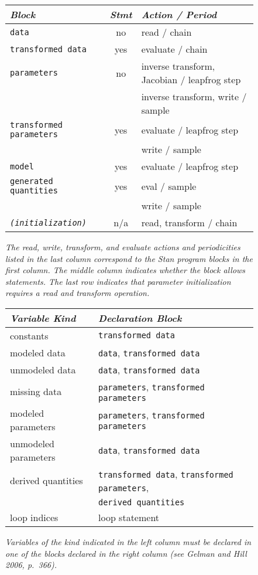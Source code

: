 \documentclass[10pt]{report}
\newcommand{\Stan}{Stan\xspace}
\newcommand{\code}[1]{{\tt #1}}
\begin{document}
\begin{figure}
\begin{center}
\begin{tabular}{l|c|l}
{\it Block} & {\it Stmt} & {\it Action / Period} 
\\\hline\hline
\code{data} & no & read / chain  
\\
\code{transformed data} & yes & evaluate / chain  
\\ \hline
\code{parameters} & no & inverse transform, Jacobian / leapfrog step  \\
& & inverse transform, write / sample 
\\[3pt]
\code{transformed parameters} & yes & evaluate / leapfrog step \\
& & write / sample 
\\\hline
\code{model} & yes & evaluate / leapfrog step 
\\\hline
\code{generated quantities} & yes & eval / sample \\
& & write / sample
\\\hline\hline
\code{\slshape (initialization)} & n/a & read, transform / chain
\end{tabular}
\end{center}
\caption{\it The read, write, transform, and evaluate actions and
  periodicities listed in the last column correspond to the \Stan
  program blocks in the first column.  The middle column indicates
  whether the block allows statements.  The last row indicates that 
  parameter initialization requires a read and transform operation.}
\label{block-actions.fig}
\end{figure}

\begin{figure}
\begin{center}
\begin{tabular}{l|l}
{\it Variable Kind} & {\it Declaration Block}
\\ \hline\hline
constants & \code{transformed data}
\\ \hline
modeled data & \code{data}, \code{transformed data}
\\
unmodeled data & \code{data}, \code{transformed data}
\\ \hline
missing data & \code{parameters}, \code{transformed parameters}
\\
modeled parameters & \code{parameters}, \code{transformed parameters}
\\
unmodeled parameters & \code{data}, \code{transformed data}
\\[2pt] \hline
derived quantities & \code{transformed data}, \code{transformed parameters}, 
\\ 
& \code{derived quantities}
\\ \hline\hline
loop indices & loop statement
\\ 
\end{tabular}
\end{center}
\caption{\it Variables of the kind indicated in the left column must
  be declared in one of the blocks declared in the right
  column (see Gelman and Hill 2006,
  p.~366).}\label{data-kinds.figure}
\end{figure}
\end{document}
